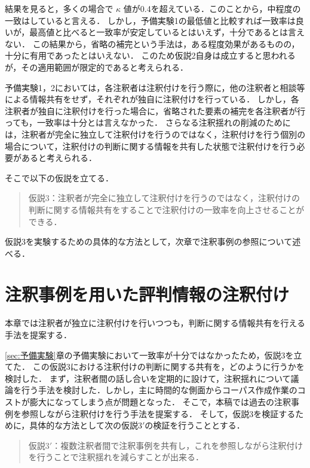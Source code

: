 \documentclass[japanese]{jnlp_1.4}
\begin{document}
結果を見ると，多くの場合で $\kappa$ 値が0.4を超えている．このことから，中程度の一致はしていると言える．
しかし，予備実験1の最低値と比較すれば一致率は良いが，最高値と比べると一致率が安定しているとはいえず，十分であるとは言えない．
この結果から，省略の補完という手法は，ある程度効果があるものの，十分に有用であったとはいえない．
このため仮説2自身は成立すると思われるが，その適用範囲が限定的であると考えられる．

予備実験1，2においては，各注釈者は注釈付けを行う際に，他の注釈者と相談等による情報共有をせず，それぞれが独自に注釈付けを行っている．
しかし，各注釈者が独自に注釈付けを行った場合に，省略された要素の補完を各注釈者が行っても，一致率は十分とは言えなかった．
さらなる注釈揺れの削減のためには，注釈者が完全に独立して注釈付けを行うのではなく，注釈付けを行う個別の場合について，注釈付けの判断に関する情報を共有した状態で注釈付けを行う必要があると考えられる．

そこで以下の仮説を立てる．

\vspace{0.5\baselineskip}
\begin{quote}
仮説3：注釈者が完全に独立して注釈付けを行うのではなく，注釈付けの判断に関する情報共有をすることで注釈付けの一致率を向上させることができる．
\end{quote}
\vspace{0.5\baselineskip}

仮説3を実験するための具体的な方法として，次章で注釈事例の参照について述べる．



\section{注釈事例を用いた評判情報の注釈付け}
\label{sec:注釈事例を用いた評判情報の注釈付け}

本章では注釈者が独立に注釈付けを行いつつも，判断に関する情報共有を行える手法を提案する．

\ref{sec:予備実験}章の予備実験において一致率が十分ではなかったため，仮説3を立てた．
この仮説3における注釈付けの判断に関する共有を，どのように行うかを検討した．
まず，注釈者間の話し合いを定期的に設けて，注釈揺れについて議論を行う手法を検討した．しかし，主に時間的な側面からコーパス作成作業のコストが膨大になってしまう点が問題となった．
そこで，本稿では過去の注釈事例を参照しながら注釈付けを行う手法を提案する．
そして，仮説3を検証するために，具体的な方法として次の仮説3$'$の検証を行うこととする．

\vspace{0.5\baselineskip}
\begin{quote}
仮説3$'$：複数注釈者間で注釈事例を共有し，これを参照しながら注釈付けを行うことで注釈揺れを減らすことが出来る．
\end{quote}
\vspace{0.5\baselineskip}
\end{document}
